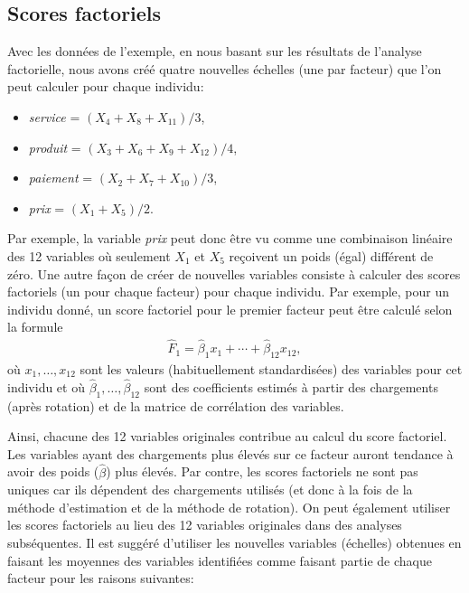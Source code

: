 \documentclass[
]{book}
\providecommand{\tightlist}{%
  \setlength{\itemsep}{0pt}\setlength{\parskip}{0pt}}
\theoremstyle{definition}
\theoremstyle{definition}
\theoremstyle{definition}
\theoremstyle{remark}
\begin{document}
\hypertarget{scores-factoriels}{%
\subsection{Scores factoriels}\label{scores-factoriels}}

Avec les données de l'exemple, en nous basant sur les résultats de l'analyse factorielle, nous avons créé quatre nouvelles échelles (une par facteur) que l'on peut calculer pour chaque individu:

\begin{itemize}
\tightlist
\item
  \emph{service} = \((X_4+X_8+X_{11})/3\),
\item
  \emph{produit} = \((X_3+X_6+X_9+X_{12})/4\),
\item
  \emph{paiement} = \((X_2+X_7+X_{10})/3\),
\item
  \emph{prix} = \((X_1+X_5)/2\).
\end{itemize}

Par exemple, la variable \emph{prix} peut donc être vu comme une combinaison linéaire des 12
variables où seulement \(X_1\) et \(X_5\) reçoivent un poids (égal) différent de zéro. Une autre façon de créer de nouvelles variables consiste à calculer des scores factoriels (un pour chaque facteur) pour chaque individu. Par exemple, pour un individu donné, un score factoriel pour le premier facteur peut être calculé selon la formule
\begin{align*}
\hat{F}_1 = \widehat{\beta}_1 x_1 + \cdots + \widehat{\beta}_{12}x_{12},
\end{align*}
où \(x_1, \ldots, x_{12}\) sont les valeurs (habituellement standardisées) des variables pour cet individu et où \(\widehat{\beta}_1, \ldots, \widehat{\beta}_{12}\) sont des coefficients estimés à partir des chargements (après rotation) et de la matrice de corrélation des variables.

Ainsi, chacune des 12 variables originales contribue au calcul du score
factoriel. Les variables ayant des chargements plus élevés sur ce facteur auront tendance à avoir des poids (\(\widehat{\beta}\)) plus élevés. Par contre, les scores factoriels ne sont pas uniques car ils dépendent des chargements utilisés (et donc à la fois de la méthode d'estimation et de la méthode de rotation).
On peut également utiliser les scores factoriels au lieu des 12 variables
originales dans des analyses subséquentes. Il est suggéré d'utiliser les nouvelles variables (échelles) obtenues en faisant les moyennes des variables identifiées comme faisant partie de chaque
facteur pour les raisons suivantes:
\end{document}
